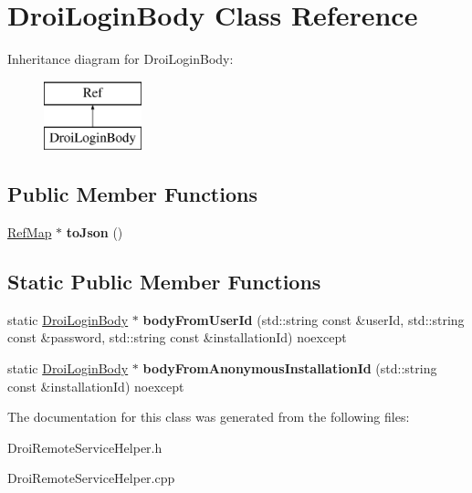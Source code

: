 \hypertarget{class_droi_login_body}{}\section{Droi\+Login\+Body Class Reference}
\label{class_droi_login_body}
Inheritance diagram for Droi\+Login\+Body\+:\begin{figure}[H]
\begin{center}
\leavevmode
\includegraphics[height=2.000000cm]{da/db4/class_droi_login_body}
\end{center}
\end{figure}
\subsection*{Public Member Functions}
\begin{DoxyCompactItemize}
\item 
\mbox{\label{class_droi_login_body_a52676467b62809e456c408832a3919b3}} 
\hyperlink{class_ref_map}{Ref\+Map} $\ast$ {\bfseries to\+Json} ()
\end{DoxyCompactItemize}
\subsection*{Static Public Member Functions}
\begin{DoxyCompactItemize}
\item 
\mbox{\label{class_droi_login_body_a793df5e57d62f0c5e2c67e5323a4a447}} 
static \hyperlink{class_droi_login_body}{Droi\+Login\+Body} $\ast$ {\bfseries body\+From\+User\+Id} (std\+::string const \&user\+Id, std\+::string const \&password, std\+::string const \&installation\+Id) noexcept
\item 
\mbox{\label{class_droi_login_body_a6af3be771fc4ac298f3552e7af69d67d}} 
static \hyperlink{class_droi_login_body}{Droi\+Login\+Body} $\ast$ {\bfseries body\+From\+Anonymous\+Installation\+Id} (std\+::string const \&installation\+Id) noexcept
\end{DoxyCompactItemize}


The documentation for this class was generated from the following files\+:\begin{DoxyCompactItemize}
\item 
Droi\+Remote\+Service\+Helper.\+h\item 
Droi\+Remote\+Service\+Helper.\+cpp\end{DoxyCompactItemize}
